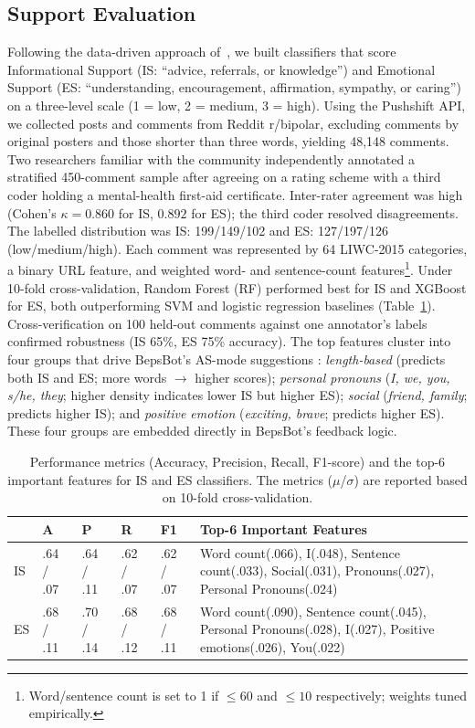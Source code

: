 \documentclass[]{llncs}
\begin{document}
\subsection{Support Evaluation}
\label{subsec:support_evaluation}

Following the data-driven approach of~\cite{Peng2020}, we built 
classifiers that score Informational Support (IS: ``advice, referrals, 
or knowledge'') and Emotional Support (ES: ``understanding, encouragement, 
affirmation, sympathy, or caring'') on a three-level scale 
(1 = low, 2 = medium, 3 = high). Using the Pushshift API, we collected 
posts and comments from Reddit r/bipolar, excluding comments by original 
posters and those shorter than three words, yielding 48,148 
comments. Two researchers familiar with the community independently 
annotated a stratified 450-comment sample after agreeing on a rating 
scheme with a third coder holding a mental-health first-aid certificate. 
Inter-rater agreement was high (Cohen's $\kappa = 0.860$ for IS, $0.892$ 
for ES); the third coder resolved disagreements. The labelled 
distribution was IS: 199/149/102 and ES: 127/197/126 (low/medium/high). Each comment was represented by 64 LIWC-2015 
categories, a binary URL feature, and weighted word- and sentence-count 
features\footnote{Word/sentence count is set to 1 if $\leq 60$ and 
$\leq 10$ respectively; weights tuned empirically.}. Under 10-fold 
cross-validation, Random Forest (RF) performed best for IS and XGBoost 
for ES, both outperforming SVM and logistic regression baselines 
(Table~\ref{tab:classifier_performance}). Cross-verification on 100 
held-out comments against one annotator's labels confirmed robustness 
(IS 65\%, ES 75\% accuracy). The top features cluster into 
four groups that drive BepsBot's AS-mode suggestions 
: \emph{length-based} (predicts both IS 
and ES; more words $\rightarrow$ higher scores); \emph{personal pronouns} 
(\emph{I, we, you, s/he, they}; higher density indicates lower IS but 
higher ES); \emph{social} (\emph{friend, family}; predicts higher IS); 
and \emph{positive emotion} (\emph{exciting, brave}; predicts higher 
ES). These four groups are embedded directly in BepsBot's feedback logic.

\begin{table}[h]
\centering
\caption{Performance metrics (Accuracy, Precision, Recall, F1-score) and the top-6 important features for IS and ES classifiers. The metrics ($\mu$/$\sigma$) are reported based on 10-fold cross-validation.}
\label{tab:classifier_performance}
\begin{tabular}{l|l|l|l|l|p{5.5cm}}
\hline
& \textbf{A} & \textbf{P} & \textbf{R} & \textbf{F1} & \textbf{Top-6 Important Features} \\
\hline
IS & .64 / .07 & .64 / .11 & .62 / .07 & .62 / .07 & Word count(.066), I(.048), Sentence count(.033), Social(.031), Pronouns(.027), Personal Pronouns(.024) \\
ES & .68 / .11 & .70 / .14 & .68 / .12 & .68 / .11 & Word count(.090), Sentence count(.045), Personal Pronouns(.028), I(.027), Positive emotions(.026), You(.022) \\
\hline
\end{tabular}
\end{table}
\end{document}
